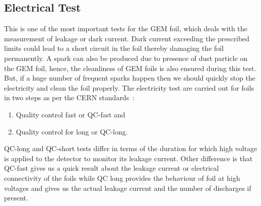 \subsection{Electrical Test} %
\label{sub:electrical_test}
This is one of the most important tests for the GEM foil, which deals with the measurement of leakage or dark current.
Dark current exceeding the prescribed limits could lead to a short circuit in the foil thereby damaging the foil permanently.
A spark can also be produced due to presence of dust particle on the GEM foil, hence, the cleanliness of GEM foils is also ensured during this test.
But, if a huge number of frequent sparks happen then we should quickly stop the electricity and clean the foil properly.
The electricity test are carried out for foils in two steps as per the CERN standards~\cite{Abbaneo2015}:
\begin{enumerate}
    \item Quality control fast or QC-fast and
    \item Quality control for long or QC-long.
\end{enumerate}
QC-long and QC-short tests differ in terms of the duration for which high voltage is applied to the detector to monitor its leakage current.
Other difference is that QC-fast gives us a quick result about the leakage current or electrical connectivity of the foils while QC long provides the behaviour of foil at high voltages and gives us the actual leakage current and the number of discharges if present.

